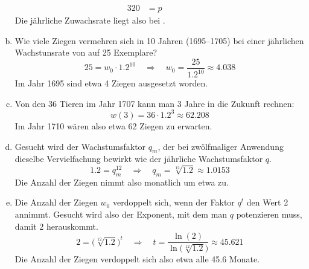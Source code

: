 \begin{exercise}
\begin{enumerate}[a)]
\begin{alignat*}{3}
              20&=p
              &
              \quad&\quad
            \end{alignat*}
            Die jährliche Zuwachsrate liegt also bei .
      \item Wie viele Ziegen vermehren sich in 10 Jahren
            (1695--1705) bei einer jährlichen Wachstunsrate von
             auf 25 Exemplare?
            \begin{equation*}
              25=w_0\cdot\num{1.2}^{10}
              \quad\Rightarrow\quad
              w_0=\frac{25}{\num{1.2}^{10}}
              \approx\num{4.038}
            \end{equation*}
            Im Jahr 1695 sind etwa 4 Ziegen ausgesetzt worden.
      \item Von den 36 Tieren im Jahr 1707 kann man 3 Jahre
            in die Zukunft rechnen:
            \begin{equation*}
              w(3)=36\cdot\num{1.2}^3\approx\num{62.208}
            \end{equation*}
            Im Jahr 1710 wären also etwa 62 Ziegen zu erwarten.
      \item Gesucht wird der Wachstumsfaktor $q_m$, der bei
            zwölfmaliger Anwendung dieselbe Vervielfachung
            bewirkt wie der jährliche Wachstumsfaktor $q$.
            \begin{equation*}
              \num{1.2}=q_m^{12}
              \quad\Rightarrow\quad
              q_m=\sqrt[12]{\num{1.2}}
              \approx\num{1.0153}
            \end{equation*}
            Die Anzahl der Ziegen nimmt also monatlich
            um etwa  zu.
      \item Die Anzahl der Ziegen $w_0$ verdoppelt sich, wenn
            der Faktor $q^t$ den Wert 2 annimmt.
            Gesucht wird also der Exponent, mit dem man $q$
            potenzieren muss, damit 2 herauskommt.
            \begin{equation*}
              2=\big(\sqrt[12]{\num{1.2}}\big)^t
              \quad\Rightarrow\quad
              t=\frac{\ln(2)}{\ln\big(\sqrt[12]{\num{1.2}}\big)}
              \approx\num{45.621}
            \end{equation*}
            Die Anzahl der Ziegen verdoppelt sich also etwa alle \num{45.6} Monate.
    \end{enumerate}
  \fi
\end{exercise}
